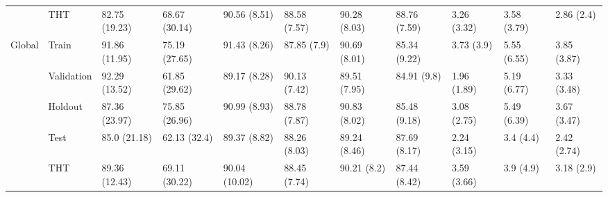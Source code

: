 \begin{table}
\begin{tabular}{lllllllllll}
       & THT &  82.75 (19.23) &  68.67 (30.14) &   90.56 (8.51) &  88.58 (7.57) &  90.28 (8.03) &  88.76 (7.59) &      3.26 (3.32) &  3.58 (3.79) &   2.86 (2.4) \\
Global & Train &  91.86 (11.95) &  75.19 (27.65) &   91.43 (8.26) &   87.85 (7.9) &  90.69 (8.01) &  85.34 (9.22) &       3.73 (3.9) &  5.55 (6.55) &  3.85 (3.87) \\
       & Validation &  92.29 (13.52) &  61.85 (29.62) &   89.17 (8.28) &  90.13 (7.42) &  89.51 (7.95) &   84.91 (9.8) &      1.96 (1.89) &  5.19 (6.77) &  3.33 (3.48) \\
       & Holdout &  87.36 (23.97) &  75.85 (26.96) &   90.99 (8.93) &  88.78 (7.87) &  90.83 (8.02) &  85.48 (9.18) &      3.08 (2.75) &  5.49 (6.39) &  3.67 (3.47) \\
       & Test &   85.0 (21.18) &   62.13 (32.4) &   89.37 (8.82) &  88.26 (8.03) &  89.24 (8.46) &  87.69 (8.17) &      2.24 (3.15) &    3.4 (4.4) &  2.42 (2.74) \\
       & THT &  89.36 (12.43) &  69.11 (30.22) &  90.04 (10.02) &  88.45 (7.74) &   90.21 (8.2) &  87.44 (8.42) &      3.59 (3.66) &    3.9 (4.9) &   3.18 (2.9) \\
\bottomrule
\end{tabular}
\end{table}
